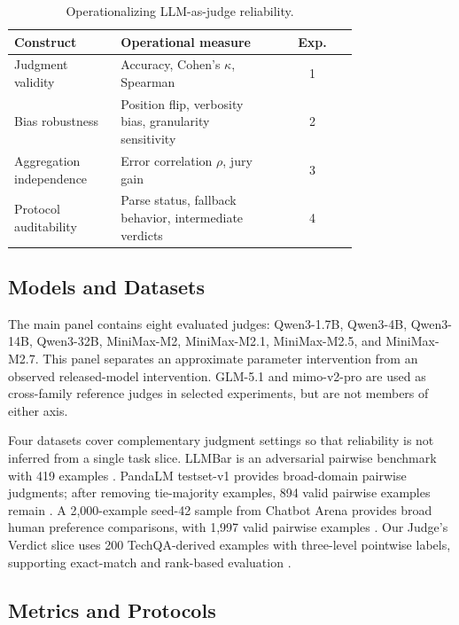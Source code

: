 \documentclass[sigconf,nonacm]{acmart}
\begin{document}
\begin{table}[t]
\centering
\caption{Operationalizing LLM-as-judge reliability.}
\label{tab:constructs}
\scriptsize
\begin{tabular}{p{0.31\linewidth}p{0.46\linewidth}c}
\toprule
Construct & Operational measure & Exp. \\
\midrule
Judgment validity & Accuracy, Cohen's $\kappa$, Spearman & 1 \\
Bias robustness & Position flip, verbosity bias, granularity sensitivity & 2 \\
Aggregation independence & Error correlation $\rho$, jury gain & 3 \\
Protocol auditability & Parse status, fallback behavior, intermediate verdicts & 4 \\
\bottomrule
\end{tabular}
\end{table}

\subsection{Models and Datasets}

The main panel contains eight evaluated judges: Qwen3-1.7B, Qwen3-4B, Qwen3-14B, Qwen3-32B, MiniMax-M2, MiniMax-M2.1, MiniMax-M2.5, and MiniMax-M2.7. This panel separates an approximate parameter intervention from an observed released-model intervention. GLM-5.1 and mimo-v2-pro are used as cross-family reference judges in selected experiments, but are not members of either axis.

Four datasets cover complementary judgment settings so that reliability is not inferred from a single task slice. LLMBar is an adversarial pairwise benchmark with 419 examples \citep{zeng2024llmbar}. PandaLM testset-v1 provides broad-domain pairwise judgments; after removing tie-majority examples, 894 valid pairwise examples remain \citep{wang2023pandalm}. A 2,000-example seed-42 sample from Chatbot Arena provides broad human preference comparisons, with 1,997 valid pairwise examples \citep{zheng2023judging}. Our Judge's Verdict slice uses 200 TechQA-derived examples with three-level pointwise labels, supporting exact-match and rank-based evaluation \citep{han2025judgesverdict,castelli2019techqa}.

\subsection{Metrics and Protocols}
\end{document}
